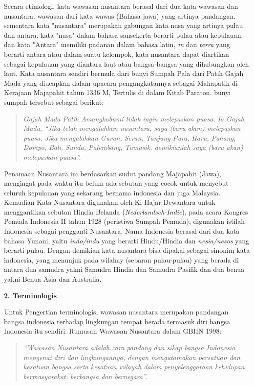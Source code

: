 \documentclass[12pt, a4paper]{article}
\begin{document}
Secara etimologi, kata wawasan nusantara berasal dari dua kata wawasan dan nusantara. wawasan dari kata wawas (Bahasa jawa) yang artinya pandangan. sementara kata "nusantara" merupakan gabungan kata nusa yang artinya pulau dan antara. kata "nusa" dalam bahasa sansekerta berarti pulau atau kepulauan. dan kata "Antara" memiliki padanan dalam bahasa latin, \textit{in } dan \textit{terra} yang berarti antara atau dalam suatu kelompok, kata nusantara dapat diartikan sebagai kepulauan yang diantara laut atau bangsa-bangsa yang dihubungkan oleh laut. Kata nusantara sendiri bermula dari bunyi Sumpah Pala dari Patih Gajah Mada yang diucapkan dalam upacara pengangkatannya sebagai Mahapatih di Kerajaan Majapahit tahun 1336 M, Tertulis di dalam Kitab Paraton. bunyi sumpah tersebut sebagai berikut:
\begin{quote}
\itshape Gajah Mada Patih Amangkubumi tidak ingin melepaskan puasa. Ia Gajah Mada, “Jika telah mengalahkan nusantara, saya (baru akan) melepaskan puasa. Jika mengalahkan Gurun, Seran, Tanjung Pura, Haru, Pahang, Dompo, Bali, Sunda, Palembang, Tumasik, demikianlah saya (baru akan) melepaskan puasa”.
\end{quote}
Penamaan Nusantara ini berdasarkan sudut pandang Majapahit (Jawa), mengingat pada waktu itu belum ada sebutan yang cocok untuk menyebut seluruh kepulauan yang sekarang bernama indonesia dan juga Malaysia. Kemudian Kata Nusantara digunakan oleh Ki Hajar Dewantara untuk menggantikan sebutan Hindia Belanda (\textit{Nederlandsch-Indie}), pada acara Kongres Pemuda Indonesia II tahun 1928 (peristiwa Sumpah Pemuda), digunakan istilah Indonesia sebagai pengganti Nusantara. Nama Indonesia berasal dari dua kata bahasa Yunani, yaitu \textit{indo/indu} yang berarti Hindu/Hindia dan \textit{nesia/nesos} yang berarti pulau. Dengan demikian kata nusantara bisa dipakai sebagai sinonim kata indonesia, yang menunjuk pada wilahay (sebaran pulau-pulau) yang berada di antara dua samudra yakni Samudra Hindia dan Samudra Pasifik dan dua benua yakni Benua Asia dan Australia.

\textbf{2. Terminologis}

Untuk Pengertian terminologis, wawasan nusantara merupakan pandangan bangsa indonesia terhadap lingkungan tempat berada termasuk diri bangsa Indonesia itu sendiri. Rumusan Wawasan Nusantara dalam GBHN 1998:
\begin{quote}
\itshape “Wawasan Nusantara adalah cara pandang dan sikap bangsa Indonesia mengenai diri dan lingkungannya, dengan mengutamakan persatuan dan kesatuan bangsa serta kesatuan wilayah dalam penyelenggaraan kehidupan bermasyarakat, berbangsa dan bernegara”.
\end{quote}
\end{document}
